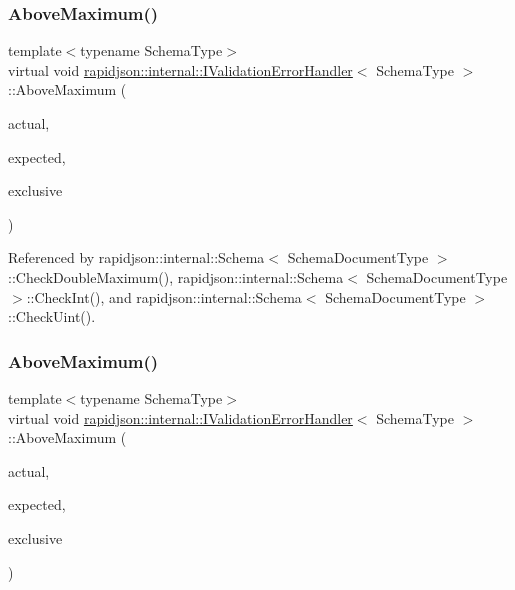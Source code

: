 \subsubsection{\texorpdfstring{AboveMaximum()}{AboveMaximum()}\hspace{0.1cm}{\footnotesize\ttfamily [1/3]}}
{\footnotesize\ttfamily template$<$typename Schema\+Type$>$ \\
virtual void \mbox{\hyperlink{classrapidjson_1_1internal_1_1_i_validation_error_handler}{rapidjson\+::internal\+::\+I\+Validation\+Error\+Handler}}$<$ Schema\+Type $>$\+::Above\+Maximum (\begin{DoxyParamCaption}\item[{\mbox{\hyperlink{stdint_8h_a414156feea104f8f75b4ed9e3121b2f6}{int64\+\_\+t}}}]{actual,  }\item[{const \mbox{\hyperlink{classrapidjson_1_1internal_1_1_i_validation_error_handler_a8a2aaf7eb28a3ce7ed81689141f3af1f}{S\+Value}} \&}]{expected,  }\item[{bool}]{exclusive }\end{DoxyParamCaption})\hspace{0.3cm}{\ttfamily [pure virtual]}}



Referenced by rapidjson\+::internal\+::\+Schema$<$ Schema\+Document\+Type $>$\+::\+Check\+Double\+Maximum(), rapidjson\+::internal\+::\+Schema$<$ Schema\+Document\+Type $>$\+::\+Check\+Int(), and rapidjson\+::internal\+::\+Schema$<$ Schema\+Document\+Type $>$\+::\+Check\+Uint().

\mbox{\label{classrapidjson_1_1internal_1_1_i_validation_error_handler_af0a7dcbd3f67cef69afb718be0221323}} 
\subsubsection{\texorpdfstring{AboveMaximum()}{AboveMaximum()}\hspace{0.1cm}{\footnotesize\ttfamily [2/3]}}
{\footnotesize\ttfamily template$<$typename Schema\+Type$>$ \\
virtual void \mbox{\hyperlink{classrapidjson_1_1internal_1_1_i_validation_error_handler}{rapidjson\+::internal\+::\+I\+Validation\+Error\+Handler}}$<$ Schema\+Type $>$\+::Above\+Maximum (\begin{DoxyParamCaption}\item[{\mbox{\hyperlink{stdint_8h_aec6fcb673ff035718c238c8c9d544c47}{uint64\+\_\+t}}}]{actual,  }\item[{const \mbox{\hyperlink{classrapidjson_1_1internal_1_1_i_validation_error_handler_a8a2aaf7eb28a3ce7ed81689141f3af1f}{S\+Value}} \&}]{expected,  }\item[{bool}]{exclusive }\end{DoxyParamCaption})\hspace{0.3cm}{\ttfamily [pure virtual]}}

